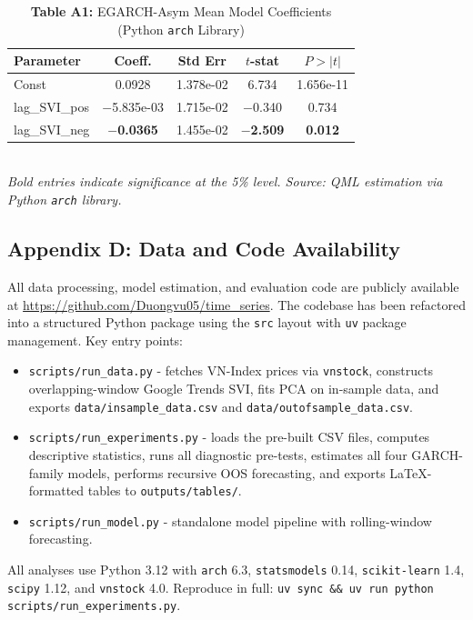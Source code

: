 \documentclass[12pt, a4paper]{article}
\begin{document}
\begin{table}[H]
\centering
\caption*{\textbf{Table A1:} EGARCH-Asym Mean Model Coefficients (Python \texttt{arch} Library)}
\small
\begin{tabular}{lcccc}
\toprule
Parameter & Coeff. & Std Err & $t$-stat & $P>|t|$ \\
\midrule
Const         & 0.0928  & 1.378e-02 & 6.734  & 1.656e-11 \\
lag\_SVI\_pos & $-$5.835e-03 & 1.715e-02 & $-$0.340 & 0.734 \\
lag\_SVI\_neg & \textbf{$-$0.0365} & 1.455e-02 & \textbf{$-$2.509} & \textbf{0.012} \\
\bottomrule
\end{tabular}
\smallskip\\
\footnotesize\textit{Bold entries indicate significance at the 5\% level. Source: QML estimation via Python \texttt{arch} library.}
\end{table}

\subsection*{Appendix D: Data and Code Availability}

All data processing, model estimation, and evaluation code are publicly available at \url{https://github.com/Duongvu05/time\_series}. The codebase has been refactored into a structured Python package using the \texttt{src} layout with \texttt{uv} package management. Key entry points:

\begin{itemize}
  \item \texttt{scripts/run\_data.py} - fetches VN-Index prices via \texttt{vnstock}, constructs overlapping-window Google Trends SVI, fits PCA on in-sample data, and exports \texttt{data/insample\_data.csv} and \texttt{data/outofsample\_data.csv}.
  \item \texttt{scripts/run\_experiments.py} - loads the pre-built CSV files, computes descriptive statistics, runs all diagnostic pre-tests, estimates all four GARCH-family models, performs recursive OOS forecasting, and exports LaTeX-formatted tables to \texttt{outputs/tables/}.
  \item \texttt{scripts/run\_model.py} - standalone model pipeline with rolling-window forecasting.
\end{itemize}

All analyses use Python 3.12 with \texttt{arch} 6.3, \texttt{statsmodels} 0.14, \texttt{scikit-learn} 1.4, \texttt{scipy} 1.12, and \texttt{vnstock} 4.0. Reproduce in full: \texttt{uv sync \&\& uv run python scripts/run\_experiments.py}.
\end{document}

